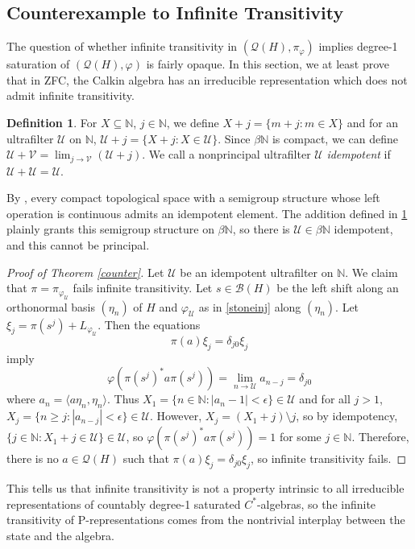 \documentclass[10pt]{amsart}
\theoremstyle{definition}
\newtheorem{defn}[thm]{Definition}
\newcommand{\U}{\mathscr{U}}
\begin{document}
\subsection{Counterexample to Infinite Transitivity}

The question of whether infinite transitivity in $(\mathscr{Q}(H),\pi_\varphi)$ implies degree-1 saturation of $(\mathscr{Q}(H),\varphi)$ is fairly opaque. In this section, we at least prove that in ZFC, the Calkin algebra has an irreducible representation which does not admit infinite transitivity.

\begin{defn}\label{idemp}
    For $X\subseteq\mathbb{N}$, $j\in\mathbb{N}$, we define $X+j=\{m+j:m\in X\}$ and for an ultrafilter $\U$ on $\mathbb{N}$, $\U+j=\{X+j:X\in \U\}$. Since $\beta\mathbb{N}$ is compact, we can define $\U+\mathscr{V}=\lim_{j\rightarrow\mathscr{V}}(\U+j)$. We call a nonprincipal ultrafilter $\U$ \textit{idempotent} if $\U+\U=\U$.
\end{defn}

    By \cite[1]{EL58}, every compact topological space with a semigroup structure whose left operation is continuous admits an idempotent element. The addition defined in \ref{idemp} plainly grants this semigroup structure on $\beta\mathbb{N}$, so there is $\U\in\beta\mathbb{N}$ idempotent, and this cannot be principal.

\begin{proof}[Proof of Theorem \ref{counter}]
    Let $\U$ be an idempotent ultrafilter on $\mathbb{N}$. We claim that $\pi=\pi_{\varphi_\U}$ fails infinite transitivity. Let $s\in\mathscr{B}(H)$ be the left shift along an orthonormal basis $(\eta_n)$ of $H$ and $\varphi_\U$ as in \ref{stoneinj} along $(\eta_n)$. Let $\xi_j=\pi(s^j)+L_{\varphi_\U}$. Then the equations
    \[\pi(a)\xi_j=\delta_{j0}\xi_j\]
    imply
    \[\varphi(\pi(s^j)^*a\pi(s^j))=\lim_{n\rightarrow\U}a_{n-j}=\delta_{j0}\]
    where $a_n=\langle a\eta_n,\eta_n\rangle$. Thus $X_1=\{n\in\mathbb{N}:|a_n-1|<\epsilon\}\in\U$ and for all $j>1$, $X_j=\{n\geq j:|a_{n-j}|<\epsilon\}\in\U$. However, $X_j=(X_1+j)\setminus j$, so by idempotency, $\{j\in\mathbb{N}:X_1+j\in\U\}\in \U$, so $\varphi(\pi(s^j)^*a\pi(s^j))=1$ for some $j\in\mathbb{N}$. Therefore, there is no $a\in\mathscr{Q}(H)$ such that $\pi(a)\xi_j=\delta_{j0}\xi_j$, so infinite transitivity fails.
\end{proof}

This tells us that infinite transitivity is not a property intrinsic to all irreducible representations of countably degree-1 saturated $C^*$-algebras, so the infinite transitivity of P-representations comes from the nontrivial interplay between the state and the algebra.
\end{document}
